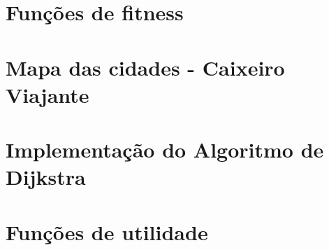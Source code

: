 \documentclass[12pt,plainheader,pnumplain]{abnt}
\newcommand{\src}{src/experiments}
\begin{document}
\newpage
\chapter{Funções de fitness}
\label{appendix:fitness}


\newpage
\chapter{Mapa das cidades - Caixeiro Viajante}
\label{appendix:dijks}


\newpage
\chapter{Implementação do Algoritmo de Dijkstra}
\label{appendix:dijks}


\newpage
\chapter{Funções de utilidade}
\label{appendix:fitness}



\end{document}
